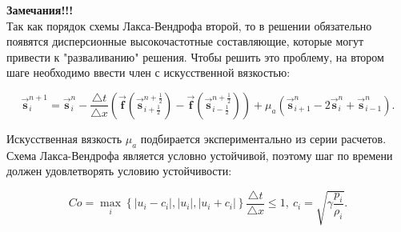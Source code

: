 \documentclass[12pt,a4paper]{article}
\begin{document}
	\textbf{\large Замечания!!!}\\

	Так как порядок схемы Лакса-Вендрофа второй, то в решении обязательно появятся дисперсионные высокочастотные составляющие, которые могут привести к "разваливанию" решения. Чтобы решить это проблему, на втором шаге необходимо ввести член с искусственной вязкостью:
	
	\begin{equation}
		\vec{\textbf{s}}^{n+1}_{i} = \vec{\textbf{s}}^{n}_{i} - \frac{\triangle t}{\triangle x} \left( \vec{\textbf{f}} \left( \vec{\textbf{s}}^{n+\frac{1}{2}}_{i+\frac{1}{2}} \right) - \vec{\textbf{f}} \left( \vec{\textbf{s}}^{n+\frac{1}{2}}_{i-\frac{1}{2}} \right) \right) + \mu_{a} \left( \vec{\textbf{s}}^{n}_{i+1} - 2 \vec{\textbf{s}}^{n}_{i} + \vec{\textbf{s}}^{n}_{i-1} \right).
	\end{equation}

	Искусственная вязкость $\mu_{a}$ подбирается экспериментально из серии расчетов.\\

	Схема Лакса-Вендрофа является условно устойчивой, поэтому шаг по времени должен удовлетворять условию устойчивости:

	\begin{equation}
		Co = \max_{i} \left\lbrace \left| u_{i} - c_{i} \right|, \left| u_{i} \right|, \left| u_{i} + c_{i} \right| \right\rbrace \frac{\triangle t}{\triangle x} \leq 1, \: c_{i} = \sqrt{\gamma \frac{p_{i}}{\rho_{i}}}.
	\end{equation}
\end{document}
